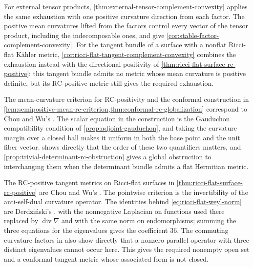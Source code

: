 For external tensor products, \cref{thm:external-tensor-complement-convexity} applies the same exhaustion with one positive curvature direction from each factor. The positive mean curvatures lifted from the factors control every vector of the tensor product, including the indecomposable ones, and give \cref{cor:stable-factor-complement-convexity}. For the tangent bundle of a surface with a nonflat Ricci-flat K\"ahler metric, \cref{cor:ricci-flat-tangent-complement-convexity} combines the exhaustion instead with the directional positivity of \cref{thm:ricci-flat-surface-rc-positive}: this tangent bundle admits no metric whose mean curvature is positive definite, but its RC-positive metric still gives the required exhaustion.

The mean-curvature criterion for RC-positivity and the conformal construction in \cref{lem:semipositive-mean-rc-criterion,thm:conformal-rc-globalization} correspond to Chou and Wu's \cite[v1, Definition~5 and Lemmas~7--8, pp.~5--6]{ChouWuRC26}. The scalar equation in the construction is the Gauduchon compatibility condition of \cref{prop:adjoint-gauduchon}, and taking the curvature margin over a closed ball makes it uniform in both the base point and the unit fiber vector.  shows directly that the order of these two quantifiers matters, and \cref{prop:trivial-determinant-rc-obstruction} gives a global obstruction to interchanging them when the determinant bundle admits a flat Hermitian metric.

The RC-positive tangent metrics on Ricci-flat surfaces in \cref{thm:ricci-flat-surface-rc-positive} are Chou and Wu's \cite[v1, Theorem~1 and Lemmas~9--15, pp.~7--12]{ChouWuRC26}. The pointwise criterion is the invertibility of the anti-self-dual curvature operator. The identities behind \eqref{eq:ricci-flat-weyl-norm} are Derdzi{\'n}ski's \cite[equations~(33)--(35), p.~414]{Derdzinski83}, with the nonnegative Laplacian on functions used there replaced by $\operatorname{div}\nabla$ and with the same norm on endomorphisms; summing the three equations for the eigenvalues gives the coefficient $36$. The commuting curvature factors in \cite[Lemma~2, p.~412]{Derdzinski83} also show directly that a nonzero parallel operator with three distinct eigenvalues cannot occur here. This gives the required nonempty open set and a conformal tangent metric whose associated form is not closed.

